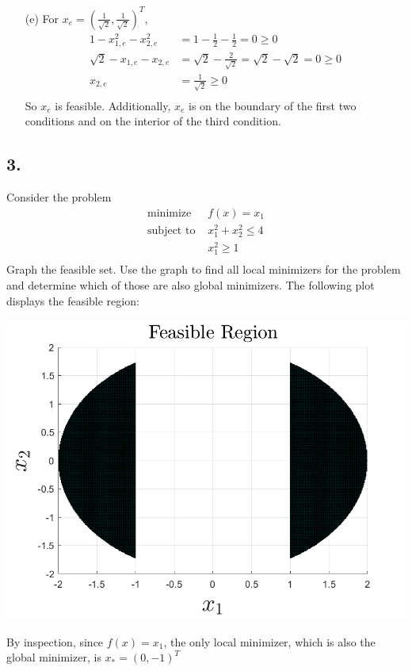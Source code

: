 \documentclass{article}
\begin{document}
\begin{itemize}
    \item[(e)] For $x_e = (\frac{1}{\sqrt{2}}, \frac{1}{\sqrt{2}})^T$,
    \begin{align*}
        1 - x_{1,e}^2 - x_{2,e}^2 &= 1 - \frac{1}{2} - \frac{1}{2} = 0 \geq 0 \\
        \sqrt{2} - x_{1,e} - x_{2,e} &= \sqrt{2} - \frac{2}{\sqrt{2}} = \sqrt{2} - \sqrt{2} = 0 \geq 0 \\
        x_{2,e} &= \frac{1}{\sqrt{2}} \geq 0 \\
    \end{align*}
    So $x_e$ is feasible. Additionally, $x_e$ is on the boundary of the first two conditions and on the interior of the third condition.
    
\end{itemize}

\subsection*{3.} Consider the problem 
\begin{align*}
    \text{minimize    } &f(x) = x_1 \\
    \text{subject to    } &x_1^2 + x_2^2 \leq 4 \\
    &x_1^2 \geq 1 \\
\end{align*}
Graph the feasible set. Use the graph to find all local minimizers for the problem and determine which of those are also global minimizers.
\newline\newline
The following plot displays the feasible region:
\begin{center}
    \includegraphics[scale = 0.45]{feasibleregion.png}
\end{center}
By inspection, since $f(x) = x_1$, the only local minimizer, which is also the global minimizer, is $x_* = (0,-1)^T$
\end{document}
